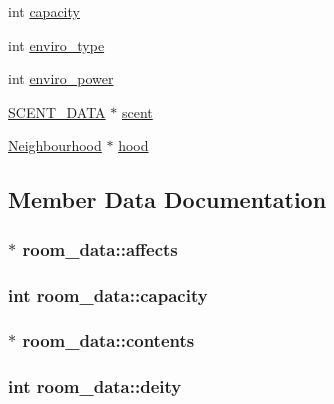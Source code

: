 \begin{DoxyCompactItemize}
int \hyperlink{structroom__data_af3e124ca1a2f90e3a5005a828eae3fc5}{capacity}
\item 
int \hyperlink{structroom__data_afbafe9a914efd5ecc9d2bb128828ba84}{enviro\-\_\-type}
\item 
int \hyperlink{structroom__data_a1332388c4d8e9b6e70d4694c0c6fd7be}{enviro\-\_\-power}
\item 
\hyperlink{structs_8h_a65372345a26d15a29af1abf6cb29f785}{S\-C\-E\-N\-T\-\_\-\-D\-A\-T\-A} $\ast$ \hyperlink{structroom__data_a811c49ce5b3a76c01002b6137a2a95e8}{scent}
\item 
\hyperlink{classNeighbourhood}{Neighbourhood} $\ast$ \hyperlink{structroom__data_a80cb0226783e1671bd5ba01f4d93ade9}{hood}
\end{DoxyCompactItemize}


\subsection{Member Data Documentation}
\hypertarget{structroom__data_a852672f3a86650ef3195e48ac8b98277}{
\subsubsection[{affects}]{$\ast$ room\-\_\-data\-::affects}}\label{structroom__data_a852672f3a86650ef3195e48ac8b98277}
\hypertarget{structroom__data_af3e124ca1a2f90e3a5005a828eae3fc5}{
\subsubsection[{capacity}]{\setlength{\rightskip}{0pt plus 5cm}int room\-\_\-data\-::capacity}}\label{structroom__data_af3e124ca1a2f90e3a5005a828eae3fc5}
\hypertarget{structroom__data_a21ae8b8d9887eccbd976893a6fe78a02}{
\subsubsection[{contents}]{$\ast$ room\-\_\-data\-::contents}}\label{structroom__data_a21ae8b8d9887eccbd976893a6fe78a02}
\hypertarget{structroom__data_a84dd99267244c69b0008fd5288ba36a4}{
\subsubsection[{deity}]{\setlength{\rightskip}{0pt plus 5cm}int room\-\_\-data\-::deity}}\label{structroom__data_a84dd99267244c69b0008fd5288ba36a4}
